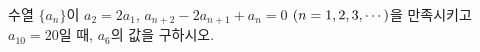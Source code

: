 수열 $\{a_n\}$이 $a_2=2a_1$, $a_{n+2}-2a_{n+1}+a_n=0$ $(n=1{,}\mkern3mu\mathopen{}2{,}\mkern3mu\mathopen{}3{,}\mkern3mu\mathopen{}\cdots)$을 만족시키고 $a_{10}=20$일 때, $a_6$의 값을 구하시오.
